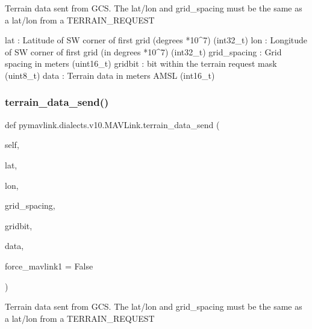 \begin{DoxyVerb}
\begin{DoxyVerb}
\begin{DoxyVerb}
\begin{DoxyVerb}
\begin{DoxyVerb}
\begin{DoxyVerb}
\begin{DoxyVerb}
\begin{DoxyVerb}
\begin{DoxyVerb}
\begin{DoxyVerb}
\begin{DoxyVerb}Terrain data sent from GCS. The lat/lon and grid_spacing must be the
same as a lat/lon from a TERRAIN_REQUEST

lat                       : Latitude of SW corner of first grid (degrees *10^7) (int32_t)
lon                       : Longitude of SW corner of first grid (in degrees *10^7) (int32_t)
grid_spacing              : Grid spacing in meters (uint16_t)
gridbit                   : bit within the terrain request mask (uint8_t)
data                      : Terrain data in meters AMSL (int16_t)\end{DoxyVerb}
 \mbox{\label{classpymavlink_1_1dialects_1_1v10_1_1MAVLink_af0a85a38c4ed889e36573288af878227}} 
\subsubsection{\texorpdfstring{terrain\+\_\+data\+\_\+send()}{terrain\_data\_send()}}
{\footnotesize\ttfamily def pymavlink.\+dialects.\+v10.\+M\+A\+V\+Link.\+terrain\+\_\+data\+\_\+send (\begin{DoxyParamCaption}\item[{}]{self,  }\item[{}]{lat,  }\item[{}]{lon,  }\item[{}]{grid\+\_\+spacing,  }\item[{}]{gridbit,  }\item[{}]{data,  }\item[{}]{force\+\_\+mavlink1 = {\ttfamily False} }\end{DoxyParamCaption})}

\begin{DoxyVerb}Terrain data sent from GCS. The lat/lon and grid_spacing must be the
same as a lat/lon from a TERRAIN_REQUEST


\end{DoxyVerb}
\end{DoxyVerb}
\end{DoxyVerb}
\end{DoxyVerb}
\end{DoxyVerb}
\end{DoxyVerb}
\end{DoxyVerb}
\end{DoxyVerb}
\end{DoxyVerb}
\end{DoxyVerb}
\end{DoxyVerb}
